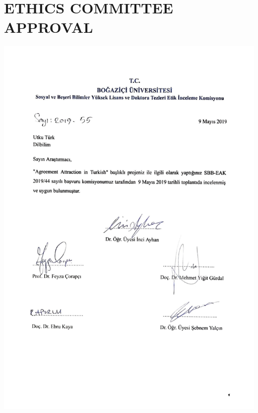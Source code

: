 
\chapter{ETHICS COMMITTEE APPROVAL} \label{ap:ethics}
\vspace*{-1cm}\hspace{-2cm}\includegraphics[width=1.10\textwidth]{figure/etik.pdf}



    


\newpage

